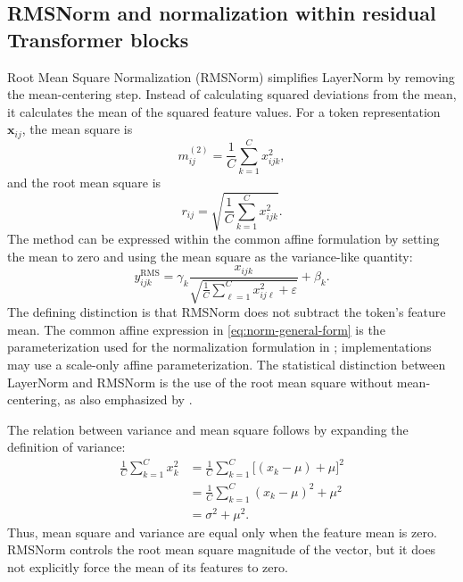 \subsection{RMSNorm and normalization within residual Transformer blocks}
\label{subsec:norm-rmsnorm-residual}

Root Mean Square Normalization (RMSNorm) simplifies LayerNorm by removing
the mean-centering step. Instead of calculating squared deviations from the
mean, it calculates the mean of the squared feature values. For a token
representation \(\mathbf{x}_{ij}\), the mean square is
\begin{equation}
    m_{ij}^{(2)}
    =
    \frac{1}{C}\sum_{k=1}^{C}x_{ijk}^{2},
    \label{eq:norm-rms-mean-square}
\end{equation}
and the root mean square is
\begin{equation}
    r_{ij}
    =
    \sqrt{
        \frac{1}{C}\sum_{k=1}^{C}x_{ijk}^{2}
    }.
    \label{eq:norm-rms}
\end{equation}
The method can be expressed within the common affine formulation by setting
the mean to zero and using the mean square as the variance-like quantity:
\begin{equation}
    \boxed{
    y_{ijk}^{\mathrm{RMS}}
    =
    \gamma_k
    \frac{x_{ijk}}
    {\sqrt{
        \frac{1}{C}\sum_{\ell=1}^{C}x_{ij\ell}^{2}
        +\varepsilon
    }}
    +\beta_k.
    }
    \label{eq:norm-rmsnorm}
\end{equation}
The defining distinction is that RMSNorm does not subtract the token's
feature mean. The common affine expression in
\cref{eq:norm-general-form} is the parameterization used for the
normalization formulation in \textcite{zhu2025dyt}; implementations may
use a scale-only affine parameterization. The statistical distinction
between LayerNorm and RMSNorm is the use of the root mean square without
mean-centering, as also emphasized by
\textcite{corradini2025slmreview}.

The relation between variance and mean square follows by expanding the
definition of variance:
\begin{align}
    \frac{1}{C}\sum_{k=1}^{C}x_k^2
    &=
    \frac{1}{C}\sum_{k=1}^{C}
    \bigl[(x_k-\mu)+\mu\bigr]^2
    \nonumber\\
    &=
    \frac{1}{C}\sum_{k=1}^{C}(x_k-\mu)^2
    +\mu^2
    \nonumber\\
    &=
    \sigma^2+\mu^2.
    \label{eq:norm-mean-square-variance}
\end{align}
Thus, mean square and variance are equal only when the feature mean is zero.
RMSNorm controls the root mean square magnitude of the vector, but it does
not explicitly force the mean of its features to zero.

